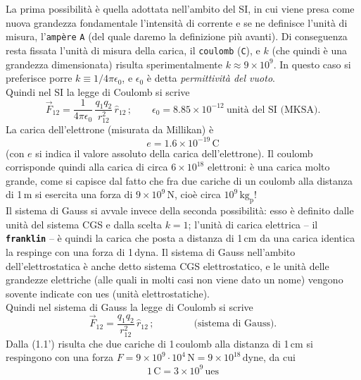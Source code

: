 La prima possibilità è quella adottata nell'ambito del SI, in cui viene presa come nuova grandezza fondamentale l'intensità di corrente e se ne definisce l'unità di misura, l'\texttt{ampère} \texttt{A} (del quale daremo la definizione più avanti). Di conseguenza resta fissata l'unità di misura della carica, il \texttt{coulomb} (\texttt{C}), e $k$ (che quindi è una grandezza dimensionata) risulta sperimentalmente $k\approx9\times10^9$. In questo caso si preferisce porre $k\equiv1/4\pi\epsilon_0$, e $\epsilon_0$ è detta \emph{permittività del vuoto}.\\
Quindi nel SI la legge di Coulomb si scrive
\begin{equation}
\vec F_{12}=\frac{1}{4\pi\epsilon_0}\,\frac{q_1q_2}{r_{12}^2}\,\hat r_{12}\,;\qquad
\epsilon_0=8.85\times10^{-12}\ \text{unità del SI (MKSA)}.
\tag{1.1'}
\end{equation}
La carica dell'elettrone (misurata da Millikan) è
\begin{equation}
e=1.6\times10^{-19}\,\mathrm{C}
\tag{1.2}
\end{equation}
(con $e$ si indica il valore assoluto della carica dell'elettrone). Il coulomb corrisponde quindi alla carica di circa $6\times10^{18}$ elettroni: è una carica molto grande, come si capisce dal fatto che fra due cariche di un coulomb alla distanza di 1\,m si esercita una forza di $9\times10^9$\,N, cioè circa $10^9\,\mathrm{kg_p}$!\\
Il sistema di Gauss si avvale invece della seconda possibilità: esso è definito dalle unità del sistema CGS e dalla scelta $k=1$; l'unità di carica elettrica -- il \texttt{\textbf{franklin}} -- è quindi la carica che posta a distanza di 1\,cm da una carica identica la respinge con una forza di 1\,dyna. Il sistema di Gauss nell'ambito dell'elettrostatica è anche detto sistema CGS elettrostatico, e le unità delle grandezze elettriche (alle quali in molti casi non viene dato un nome) vengono sovente indicate con ues (unità elettrostatiche).\\
Quindi nel sistema di Gauss la legge di Coulomb si scrive
\begin{equation}
\vec F_{12}=\frac{q_1q_2}{r_{12}^2}\,\hat r_{12}\,;\qquad\qquad \text{(sistema di Gauss).}
\tag{1.1''}
\end{equation}
Dalla (1.1') risulta che due cariche di 1\,coulomb alla distanza di 1\,cm si respingono con una forza $F=9\times10^9\cdot10^4\,\mathrm{N}=9\times10^{18}\,\mathrm{dyne}$, da cui
\begin{equation}
1\,\mathrm{C}=3\times10^9\,\mathrm{ues}
\tag{1.3}
\end{equation}
